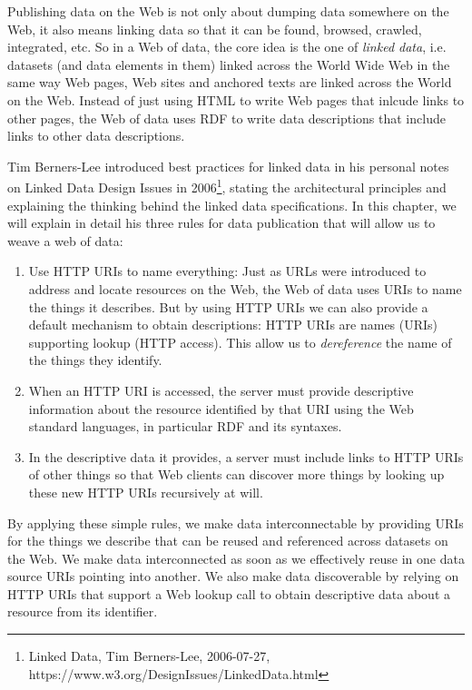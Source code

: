 Publishing data on the Web is not only about dumping data somewhere on
the Web, it also means linking data so that it can be found, browsed,
crawled, integrated, etc. So in a Web of data, the core idea is the one
of \emph{linked data}, i.e. datasets (and data elements in them)  linked across the
World Wide Web in the same way Web pages, Web sites and anchored texts
are linked across the World on the Web. Instead of just
using HTML to write Web pages that inlcude links to other pages, the Web of
data uses RDF to write data descriptions that include links to other data
descriptions.

Tim Berners-Lee introduced best practices for linked data in his
personal notes on Linked Data Design Issues in 2006\footnote{Linked
  Data, Tim Berners-Lee, 2006-07-27,
  https://www.w3.org/DesignIssues/LinkedData.html}, stating the
architectural principles and explaining the thinking behind the linked data
specifications.   In this chapter, we will explain in detail his three rules 
for data publication that will allow us to weave a web of data:



\begin{enumerate}
\def\labelenumi{\arabic{enumi}.}
\item
  Use HTTP URIs to name everything: Just as URLs were introduced to
  address and locate resources on the Web, the Web of data uses URIs to
  name the things it describes. But by using HTTP URIs we can also
  provide a default mechanism to obtain descriptions: HTTP URIs are
  names (URIs) supporting lookup (HTTP access). This allow us to
  \textit{dereference} the name of the things they identify.
\item
  When an HTTP URI is accessed, the server must provide descriptive
  information about the resource identified by that URI using the Web
  standard languages, in particular RDF and its syntaxes.
\item
  In the descriptive data it provides, a server must include links to
  HTTP URIs of other things so that Web clients can discover more things
  by looking up these new HTTP URIs recursively at will.
\end{enumerate}

By applying these simple rules, we make data interconnectable by
providing URIs for the things we describe that can be reused and
referenced across datasets on the Web. We make data interconnected as
soon as we effectively reuse in one data source URIs pointing into
another. We also make data discoverable by relying on HTTP URIs that
support a Web lookup call to obtain descriptive data about a resource
from its identifier.

